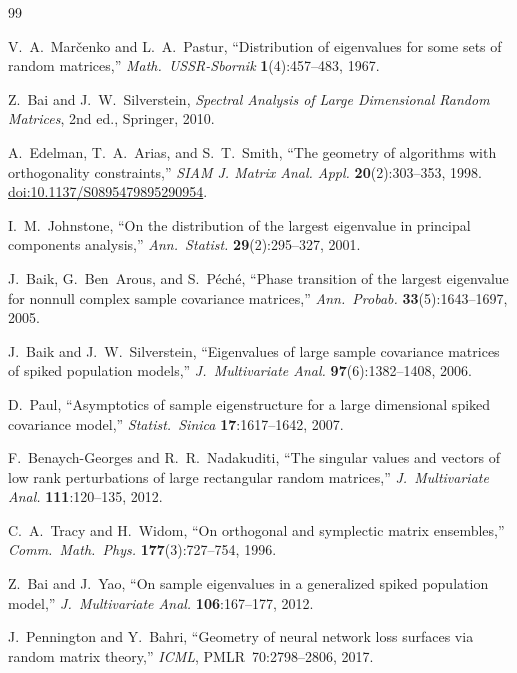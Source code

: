 \documentclass[11pt]{article}
\theoremstyle{definition}
\theoremstyle{remark}
\begin{document}
\begin{thebibliography}{99}

V.~A.~Mar\v{c}enko and L.~A.~Pastur,
``Distribution of eigenvalues for some sets of random matrices,''
\emph{Math.\ USSR-Sbornik} \textbf{1}(4):457--483, 1967.

Z.~Bai and J.~W.~Silverstein,
\emph{Spectral Analysis of Large Dimensional Random Matrices}, 2nd ed.,
Springer, 2010.

A.~Edelman, T.~A.~Arias, and S.~T.~Smith,
``The geometry of algorithms with orthogonality constraints,''
\emph{SIAM J. Matrix Anal. Appl.} \textbf{20}(2):303--353, 1998.
\href{https://doi.org/10.1137/S0895479895290954}{doi:10.1137/S0895479895290954}.

I.~M.~Johnstone,
``On the distribution of the largest eigenvalue in principal components analysis,''
\emph{Ann.\ Statist.} \textbf{29}(2):295--327, 2001.

J.~Baik, G.~Ben~Arous, and S.~P\'ech\'e,
``Phase transition of the largest eigenvalue for nonnull complex sample covariance matrices,''
\emph{Ann.\ Probab.} \textbf{33}(5):1643--1697, 2005.

J.~Baik and J.~W.~Silverstein,
``Eigenvalues of large sample covariance matrices of spiked population models,''
\emph{J.\ Multivariate Anal.} \textbf{97}(6):1382--1408, 2006.

D.~Paul,
``Asymptotics of sample eigenstructure for a large dimensional spiked covariance model,''
\emph{Statist.\ Sinica} \textbf{17}:1617--1642, 2007.

F.~Benaych-Georges and R.~R.~Nadakuditi,
``The singular values and vectors of low rank perturbations of large rectangular random matrices,''
\emph{J.\ Multivariate Anal.} \textbf{111}:120--135, 2012.

C.~A.~Tracy and H.~Widom,
``On orthogonal and symplectic matrix ensembles,''
\emph{Comm.\ Math.\ Phys.} \textbf{177}(3):727--754, 1996.

Z.~Bai and J.~Yao,
``On sample eigenvalues in a generalized spiked population model,''
\emph{J.\ Multivariate Anal.} \textbf{106}:167--177, 2012.

J.~Pennington and Y.~Bahri,
``Geometry of neural network loss surfaces via random matrix theory,''
\emph{ICML}, PMLR~70:2798--2806, 2017.


\end{thebibliography}
\end{document}
